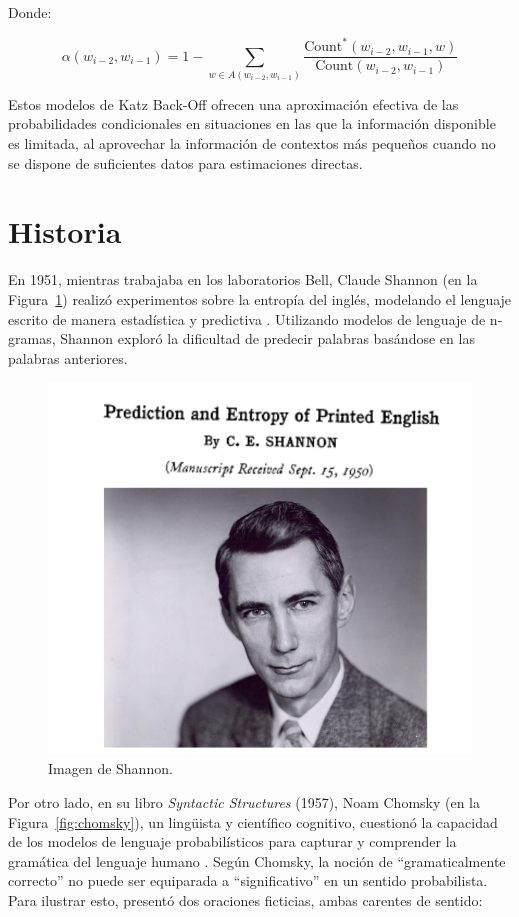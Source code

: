\documentclass[11pt,fleqn]{book} %
\begin{document}
Donde:

\[
\alpha(w_{i-2}, w_{i-1}) = 1 - \sum_{w \in A(w_{i-2}, w_{i-1})} \frac{\text{Count}^*(w_{i-2}, w_{i-1}, w)}{\text{Count}(w_{i-2}, w_{i-1})}
\]

Estos modelos de Katz Back-Off ofrecen una aproximación efectiva de las probabilidades condicionales en situaciones en las que la información disponible es limitada, al aprovechar la información de contextos más pequeños cuando no se dispone de suficientes datos para estimaciones directas.

\section{Historia}
En 1951, mientras trabajaba en los laboratorios Bell, Claude Shannon (en la Figura~\ref{fig:shannon}) realizó experimentos sobre la entropía del inglés, modelando el lenguaje escrito de manera estadística y predictiva \cite{shannon1951prediction}. Utilizando modelos de lenguaje de n-gramas, Shannon exploró la dificultad de predecir palabras basándose en las palabras anteriores.

\begin{figure}[h]
    \centering
    \includegraphics[scale = 0.4]{pics/shannon.png}
    \caption{Imagen de Shannon.}
    \label{fig:shannon}
\end{figure}

Por otro lado, en su libro \textit{Syntactic Structures} (1957), Noam Chomsky (en la Figura~\ref{fig:chomsky}), un lingüista y científico cognitivo, cuestionó la capacidad de los modelos de lenguaje probabilísticos para capturar y comprender la gramática del lenguaje humano \cite{chomsky2009syntactic}. Según Chomsky, la noción de ``gramaticalmente correcto'' no puede ser equiparada a ``significativo'' en un sentido probabilista. Para ilustrar esto, presentó dos oraciones ficticias, ambas carentes de sentido:
\end{document}
